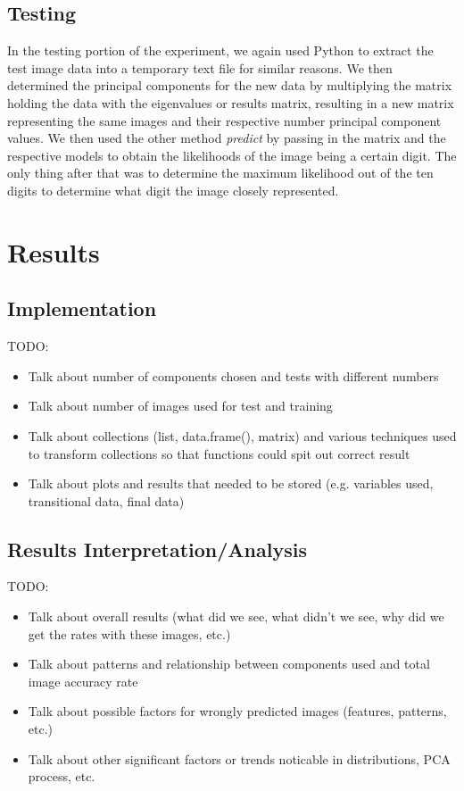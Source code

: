 \documentclass[twocolumn]{article}
\begin{document}
\subsection{Testing} %
\label{subsec:testing}
In the testing portion of the experiment, we again used Python to extract the test image data into a temporary text file for similar reasons. We then determined the principal components for the new data by multiplying the matrix holding the data with the eigenvalues or results matrix, resulting in a new matrix representing the same images and their respective number principal component values. We then used the other method \emph{predict} by passing in the matrix and the respective models to obtain the likelihoods of the image being a certain digit. The only thing after that was to determine the maximum likelihood out of the ten digits to determine what digit the image closely represented.
\section{Results} %
\label{sec:results}

\subsection{Implementation}
\label{subsec:narrative}

TODO:
\begin{itemize}
    \item Talk about number of components chosen and tests with different numbers
    \item Talk about number of images used for test and training
    \item Talk about collections (list, data.frame(), matrix) and various techniques used to transform collections so that functions could spit out correct result
    \item Talk about plots and results that needed to be stored (e.g. variables used, transitional data, final data)
\end{itemize}


\subsection{Results Interpretation/Analysis}
\label{subsec:interpretation}

TODO:
\begin{itemize}
    \item Talk about overall results (what did we see, what didn't we see, why did we get the rates with these images, etc.)
    \item Talk about patterns and relationship between components used and total image accuracy rate
    \item Talk about possible factors for wrongly predicted images (features, patterns, etc.)
    \item Talk about other significant factors or trends noticable in distributions, PCA process, etc.
\end{itemize}
\end{document}
